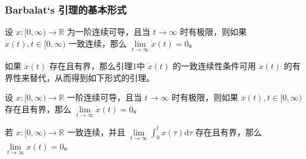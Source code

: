\begin{frame}
  \frametitle{Barbalat‘s 引理的基本形式}

  \begin{lemma}
  设 $x:[0, \infty) \to \mathbb{R}$ 为一阶连续可导，且当 $t \to \infty$ 时有极限，则如果 $\dot{x}(t), t \in [0, \infty)$ 一致连续，那么 $\lim\limits_{t \to \infty} \dot{x}(t) = 0$。
  \end{lemma} 

  如果 $\ddot{x}(t)$ 存在且有界，那么引理1中 $\dot{x}(t)$ 的一致连续性条件可用 $\ddot{x}(t)$ 的有界性来替代，从而得到如下形式的引理。

  \begin{lemma}
  设 $x:[0, \infty) \to \mathbb{R}$ 一阶连续可导，且当 $t \to \infty$ 时有极限，则如果 $\ddot{x}(t), t \in [0, \infty)$ 存在且有界，那么 $\lim\limits_{t \to \infty} \dot{x}(t) = 0$。
  \end{lemma}

  \begin{corollary}
    若 $x: [0, \infty) \to \mathbb{R}$ 一致连续，并且 $\lim\limits_{t \to \infty} \int_{0}^{t} x(\tau) \mathrm{d}\tau$ 存在且有界，那么 $\lim\limits_{t \to \infty} x(t) = 0$。
  \end{corollary}
\end{frame}







